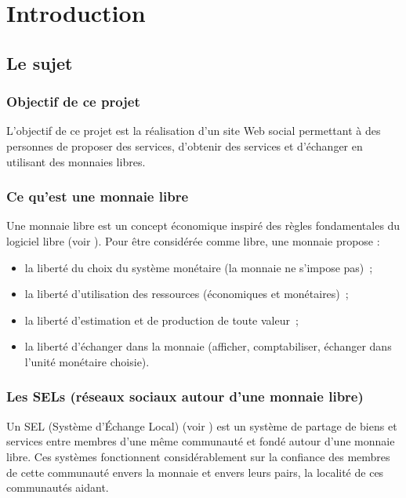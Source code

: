 \chapter{Introduction}

\section{Le sujet}

\subsection{Objectif de ce projet}

L'objectif de ce projet est la réalisation d'un site Web social permettant à des personnes de proposer des services, d'obtenir des services et d'échanger en utilisant des monnaies libres.

\subsection{Ce qu'est une monnaie libre}

Une monnaie libre est un concept économique inspiré des règles fondamentales du logiciel libre (voir \cite{monnaie}).
Pour être considérée comme libre, une monnaie propose :
\begin{itemize}
    \item la liberté du choix du système monétaire (la monnaie ne s'impose pas)~;
    \item la liberté d'utilisation des ressources (économiques et monétaires)~;
    \item la liberté d'estimation et de production de toute valeur~;
    \item la liberté d'échanger dans la monnaie (afficher, comptabiliser, échanger dans l'unité monétaire choisie).
\end{itemize}

\subsection{Les SELs (réseaux sociaux autour d'une monnaie libre)}


Un SEL (Système d'Échange Local) (voir \cite{sel}) est un système de partage de biens et services entre membres d'une même communauté et fondé autour d'une monnaie libre.
Ces systèmes fonctionnent considérablement sur la confiance des membres de cette communauté envers la monnaie et envers leurs pairs, la localité de ces communautés aidant.

